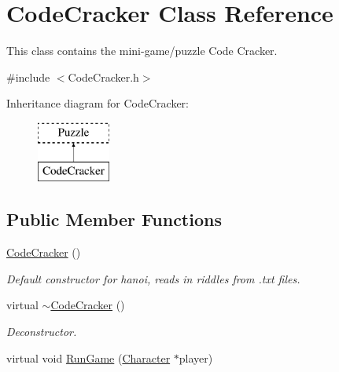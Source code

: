 \hypertarget{classCodeCracker}{\section{Code\-Cracker Class Reference}
\label{classCodeCracker}
}


This class contains the mini-\/game/puzzle Code Cracker.  




{\ttfamily \#include $<$Code\-Cracker.\-h$>$}

Inheritance diagram for Code\-Cracker\-:\begin{figure}[H]
\begin{center}
\leavevmode
\includegraphics[height=2.000000cm]{classCodeCracker}
\end{center}
\end{figure}
\subsection*{Public Member Functions}
\begin{DoxyCompactItemize}
\item 
\hyperlink{classCodeCracker_a46b5ec438efd38104b9a406b45c8cd68}{Code\-Cracker} ()
\begin{DoxyCompactList}\small\item\em Default constructor for hanoi, reads in riddles from .txt files. \end{DoxyCompactList}\item 
virtual \hyperlink{classCodeCracker_ae7dc389e166286ca2271625154dde39c}{$\sim$\-Code\-Cracker} ()
\begin{DoxyCompactList}\small\item\em Deconstructor. \end{DoxyCompactList}\item 
virtual void \hyperlink{classCodeCracker_a77c80b74947f9f37eaa8319b32c606b0}{Run\-Game} (\hyperlink{classCharacter}{Character} $\ast$player)
\end{DoxyCompactItemize}
